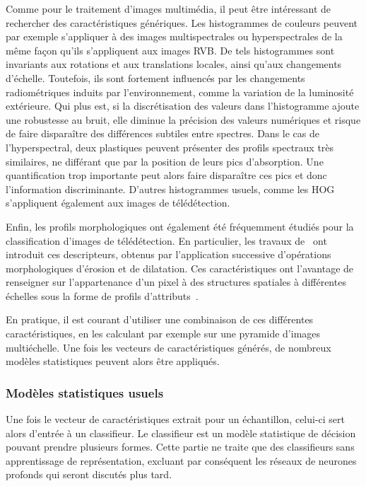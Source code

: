 Comme pour le traitement d'images multimédia, il peut être intéressant de rechercher des caractéristiques génériques. Les histogrammes de couleurs peuvent par exemple s'appliquer à des images multispectrales ou hyperspectrales de la même façon qu'ils s'appliquent aux images \gls{RVB}. De tels histogrammes sont invariants aux rotations et aux translations locales, ainsi qu'aux changements d'échelle. Toutefois, ils sont fortement influencés par les changements radiométriques induits par l'environnement, comme la variation de la luminosité extérieure. Qui plus est, si la discrétisation des valeurs dans l'histogramme ajoute une robustesse au bruit, elle diminue la précision des valeurs numériques et risque de faire disparaître des différences subtiles entre spectres. Dans le cas de l'hyperspectral, deux plastiques peuvent présenter des profils spectraux très similaires, ne différant que par la position de leurs pics d'absorption. Une quantification trop importante peut alors faire disparaître ces pics et donc l'information discriminante. D'autres histogrammes usuels, comme les \gls{HOG}~\cite{dalal_histograms_2005} s'appliquent également aux images de télédétection.

Enfin, les profils morphologiques ont également été fréquemment étudiés pour la classification d'images de télédétection. En particulier, les travaux de~\citet{benediktsson_classification_2003} ont introduit ces descripteurs, obtenus par l'application successive d'opérations morphologiques d'érosion et de dilatation. Ces caractéristiques ont l'avantage de renseigner sur l'appartenance d'un pixel à des structures spatiales à différentes échelles sous la forme de profils d'attributs~\cite{dalla_mura_morphological_2010}.

En pratique, il est courant d'utiliser une combinaison de ces différentes caractéristiques, en les calculant par exemple sur une pyramide d'images multiéchelle. Une fois les vecteurs de caractéristiques générés, de nombreux modèles statistiques peuvent alors être appliqués.

\subsubsection{Modèles statistiques usuels}

Une fois le vecteur de caractéristiques extrait pour un échantillon, celui-ci sert alors d'entrée à un classifieur. Le classifieur est un modèle statistique de décision pouvant prendre plusieurs formes. Cette partie ne traite que des classifieurs sans apprentissage de représentation, excluant par conséquent les réseaux de neurones profonds qui seront discutés plus tard.

